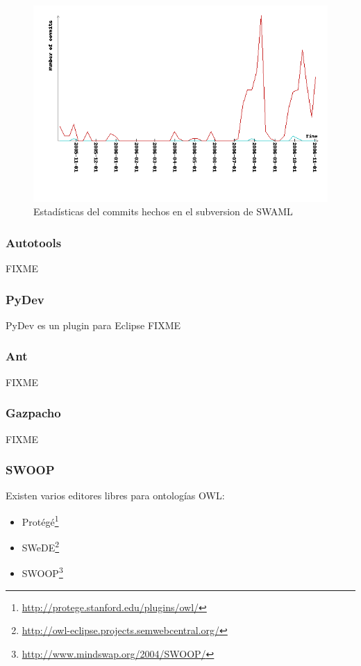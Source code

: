 \begin{figure}[ht]
	\centering
	\includegraphics[width=12cm]{images/svn-stats.png}
	\caption{Estadísticas del commits hechos en el subversion de SWAML}
	\label{fig:svnStats}
\end{figure}

\subsubsection{Autotools}

FIXME

\subsubsection{PyDev}

PyDev es un plugin para Eclipse FIXME

\subsubsection{Ant}

FIXME

\subsubsection{Gazpacho}

FIXME

\subsubsection{SWOOP}

Existen varios editores libres para ontologías OWL:

\begin{itemize}
  \item Protégé\footnote{\url{http://protege.stanford.edu/plugins/owl/}}
  \item SWeDE\footnote{\url{http://owl-eclipse.projects.semwebcentral.org/}}
  \item SWOOP\footnote{\url{http://www.mindswap.org/2004/SWOOP/}}
\end{itemize}

